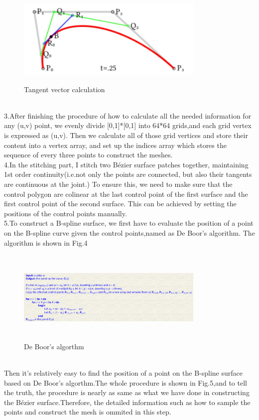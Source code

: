 \documentclass[acmtog]{acmart}
\begin{document}
\begin{figure}[h]
	\centering
	\includegraphics[width=9cm,height=4.5cm]{algorithm3.PNG}
	\caption{Tangent vector calculation}
\end{figure}
\\\indent 3.After finishing the procedure of how to calculate all the needed information for any (u,v) point, we evenly divide [0,1]*[0,1] into 64*64 grids,and each grid vertex is expressed as (u,v). Then we calculate all of those grid vertices and store their content into a vertex array, and set up the indices array which stores the sequence of every three points to construct the meshes.
\\\indent 4.In the stitching part, I stitch two Bézier surface patches together, maintaining 1st order continuity(i.e.not only the points are connected, but also their tangents are continuous at the joint.) To ensure this, we need to make sure that the control polygon are colinear at the last control point of the first surface and the first control point of the second surface. This can be achieved by setting the positions of the control points manually. 
\\\indent 5.To construct a B-spline surface, we first have to evaluate the position of a point on the B-spline curve given the control points,named as De Boor's algorithm. The algorithm is shown in Fig.4
\begin{figure}[h]
	\centering
	\includegraphics[width=9cm,height=4.5cm]{b_algorithm1.PNG}
	\caption{De Boor's algorthm}
\end{figure}
\\\indent Then it's relatively easy to find the position of a point on the B-spline surface based on De Boor's algorthm.The whole procedure is shown in Fig.5,and to tell the truth, the procedure is nearly as same as what we have done in constructing the Bézier surface.Therefore, the detailed information such as how to sample the points and construct the mesh is ommited in this step.
\end{document}
